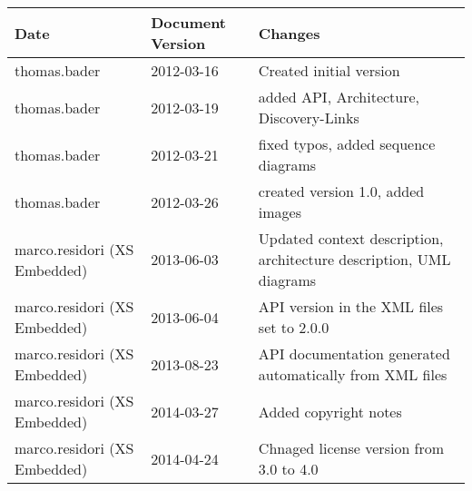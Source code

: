 \documentclass[a4paper]{article}
\begin{document}
\begin{titlepage}
\begin{tabular}{ | l | l | p{9.5cm} | }
\hline
Date & Document Version & Changes \\
\hline
thomas.bader & 2012-03-16 & Created initial version \\
\hline
thomas.bader & 2012-03-19 & added API, Architecture, Discovery-Links \\
\hline
thomas.bader & 2012-03-21 & fixed typos, added sequence diagrams \\
\hline
thomas.bader & 2012-03-26 & created version 1.0, added images \\
\hline
marco.residori (XS Embedded) & 2013-06-03 & Updated context description, architecture description, UML diagrams \\
\hline
marco.residori (XS Embedded) & 2013-06-04 & API version in the XML files set to 2.0.0 \\
\hline
marco.residori (XS Embedded) & 2013-08-23 & API documentation generated automatically from XML files \\
\hline
marco.residori (XS Embedded) & 2014-03-27 & Added copyright notes \\
\hline
marco.residori (XS Embedded) & 2014-04-24 & Chnaged license version from 3.0 to 4.0 \\
\hline
\end{tabular}


\end{titlepage}
\clearemptydoublepage
{}
\tableofcontents
\clearemptydoublepage
{}
\hypersetup{pageanchor=true}
\end{document}

